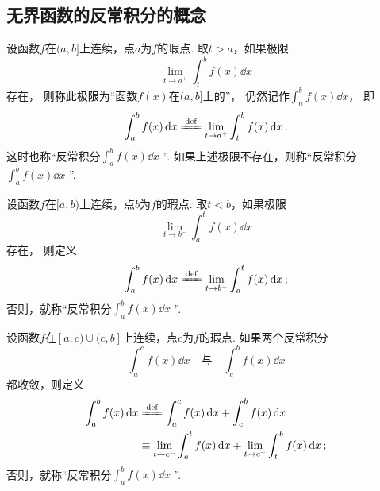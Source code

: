 \subsection{无界函数的反常积分的概念}
\begin{definition}\label{definition:定积分.无界函数的反常积分的定义1}
设函数\(f\)在\((a,b]\)上连续，点\(a\)为\(f\)的瑕点.
取\(t > a\)，如果极限\[
\lim\limits_{t \to a^+} \int_t^b f(x) \dd{x}
\]存在，%
则称此极限为“函数\(f(x)\)在\((a,b]\)上的”，%
仍然记作\(\int_a^b f(x) \dd{x}\)，%
即
\begin{equation}
\int_a^b f(x) \dd{x}
\defeq
\lim\limits_{t \to a^+} \int_t^b f(x) \dd{x}.
\end{equation}
这时也称“反常积分\(\int_a^b f(x) \dd{x}\) ”.
如果上述极限不存在，则称“反常积分\(\int_a^b f(x) \dd{x}\) ”.
\end{definition}

\begin{definition}\label{definition:定积分.无界函数的反常积分的定义2}
设函数\(f\)在\([a,b)\)上连续，点\(b\)为\(f\)的瑕点.
取\(t < b\)，如果极限\[
\lim\limits_{t \to b^-} \int_a^t f(x) \dd{x}
\]存在，%
则定义
\begin{equation}
\int_a^b f(x) \dd{x}
\defeq
\lim\limits_{t \to b^-} \int_a^t f(x) \dd{x};
\end{equation}
否则，就称“反常积分\(\int_a^b f(x) \dd{x}\) ”.
\end{definition}

\begin{definition}\label{definition:定积分.无界函数的反常积分的定义3}
设函数\(f\)在\([a,c)\cup(c,b]\)上连续，点\(c\)为\(f\)的瑕点.
如果两个反常积分\[
\int_a^c f(x) \dd{x}
\quad\text{与}\quad
\int_c^b f(x) \dd{x}
\]都收敛，则定义
\begin{equation}
\begin{split}
\int_a^b f(x) \dd{x}
&\defeq \int_a^c f(x) \dd{x} + \int_c^b f(x) \dd{x} \\
&\equiv \lim\limits_{t \to c^-} \int_a^t f(x) \dd{x}
	+ \lim\limits_{t \to c^+} \int_t^b f(x) \dd{x};
\end{split}
\end{equation}
否则，就称“反常积分\(\int_a^b f(x) \dd{x}\) ”.
\end{definition}

